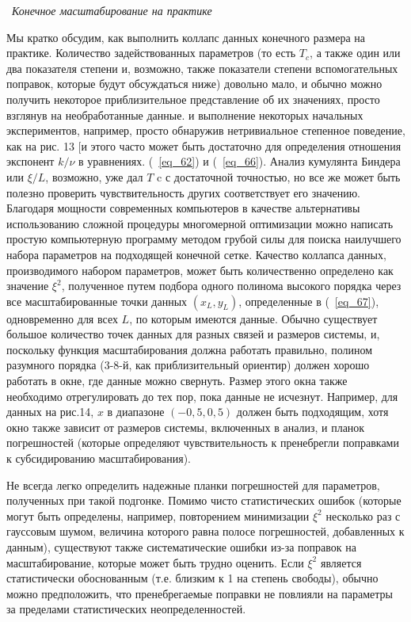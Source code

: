 \documentclass[11pt]{article}
\begin{document}
~\emph{Конечное масштабирование на практике}

Мы кратко обсудим, как выполнить коллапс данных конечного размера на практике. Количество задействованных параметров (то есть $T_c$, а также один или два показателя степени и, возможно, также показатели степени вспомогательных поправок, которые будут обсуждаться ниже) довольно мало, и обычно можно получить некоторое приблизительное представление об их значениях, просто взглянув на необработанные данные. и выполнение некоторых начальных экспериментов, например, просто обнаружив нетривиальное степенное поведение, как на рис. 13 [и этого часто может быть достаточно для определения отношения экспонент $k / \nu$ в уравнениях. (~\ref{eq_62}) и (~\ref{eq_66}). Анализ кумулянта Биндера или $\xi / L$, возможно, уже дал $T$ c с достаточной точностью, но все же может быть полезно проверить чувствительность других соответствует его значению. Благодаря мощности современных компьютеров в качестве альтернативы использованию сложной процедуры многомерной оптимизации можно написать простую компьютерную программу методом грубой силы для поиска наилучшего набора параметров на подходящей конечной сетке. Качество коллапса данных, производимого набором параметров, может быть количественно определено как значение $\xi^2$, полученное путем подбора одного полинома высокого порядка через все масштабированные точки данных $(x_L, y_L)$, определенные в (~\ref{eq_67}), одновременно для всех $L$, по которым имеются данные. Обычно существует большое количество точек данных для разных связей и размеров системы, и, поскольку функция масштабирования должна работать правильно, полином разумного порядка (3-8-й, как приблизительный ориентир) должен хорошо работать в окне, где данные можно свернуть. Размер этого окна также необходимо отрегулировать до тех пор, пока данные не исчезнут. Например, для данных на рис.14, $x$ в диапазоне $(-0,5, 0,5)$ должен быть подходящим, хотя окно также зависит от размеров системы, включенных в анализ, и планок погрешностей (которые определяют чувствительность к пренебрегли поправками к субсидированию масштабирования).

Не всегда легко определить надежные планки погрешностей для параметров, полученных при такой подгонке. Помимо чисто статистических ошибок (которые могут быть определены, например, повторением минимизации $\xi^2$ несколько раз с гауссовым шумом, величина которого равна полосе погрешностей, добавленных к данным), существуют также систематические ошибки из-за поправок на масштабирование, которые может быть трудно оценить. Если $\xi^2$ является статистически обоснованным (т.е. близким к 1 на степень свободы), обычно можно предположить, что пренебрегаемые поправки не повлияли на параметры за пределами статистических неопределенностей.
\end{document}
